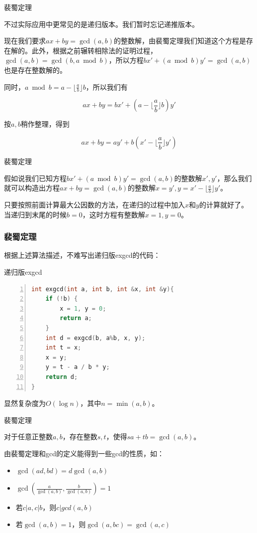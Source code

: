 \documentclass{ctexbeamer}        %
\begin{document}
\begin{frame}{裴蜀定理}

不过实际应用中更常见的是递归版本。我们暂时忘记递推版本。

现在我们要求$ax+by=\gcd(a,b)$的整数解，由裴蜀定理我们知道这个方程是存在解的。此外，根据之前辗转相除法的证明过程，$\gcd(a,b)=\gcd(b,a \bmod b)$，所以方程$bx'+(a \bmod b)y'=\gcd(a,b)$也是存在整数解的。

同时，$a \bmod b = a - \lfloor \frac{a}{b} \rfloor b$，所以我们有

$$ax+by=bx'+(a - \lfloor \frac{a}{b} \rfloor b)y'$$

按$a,b$稍作整理，得到

$$ax+by=ay'+b(x'- \lfloor \frac{a}{b} \rfloor y')$$

\end{frame}

\begin{frame}{裴蜀定理}

假如说我们已知方程$bx'+(a \bmod b)y'=\gcd(a,b)$的整数解$x',y'$，那么我们就可以构造出方程$ax+by=\gcd(a,b)$的整数解$x=y',y=x'- \lfloor \frac{a}{b} \rfloor y'$。

只要按照前面计算最大公因数的方法，在递归的过程中加入$x$和$y$的计算就好了。当递归到末尾的时候$b=0$，这时方程有整数解$x=1,y=0$。

\end{frame}

\begin{frame}[fragile]
\frametitle{裴蜀定理}

根据上述算法描述，不难写出递归版exgcd的代码：
\begin{block}{递归版exgcd}
\begin{lstlisting}[language={c++},
                   numbers=left]
int exgcd(int a, int b, int &x, int &y){
    if (!b) {
        x = 1, y = 0;
        return a;
    }
    int d = exgcd(b, a%b, x, y);
    int t = x;
    x = y;
    y = t - a / b * y;
    return d;
}
\end{lstlisting}
\end{block}
显然复杂度为$O(\log n)$，其中$n=\min(a,b)$。
\end{frame}

\begin{frame}{裴蜀定理}

\begin{theorem}[裴蜀定理]
    对于任意正整数$a,b$，存在整数$s,t$，使得$sa+tb=\gcd(a,b)$。
\end{theorem}

由裴蜀定理和gcd的定义能得到一些gcd的性质，如：

\begin{itemize}
    \item $\gcd(ad,bd)=d\gcd(a,b)$
    \item $\gcd(\frac{a}{\gcd(a,b)},\frac{b}{\gcd(a,b)})=1$
    \item 若$c|a,c|b$，则$c|gcd(a,b)$
    \item 若$\gcd(a,b)=1$，则$\gcd(a,bc)=\gcd(a,c)$
\end{itemize}

\end{frame}
\end{document}
